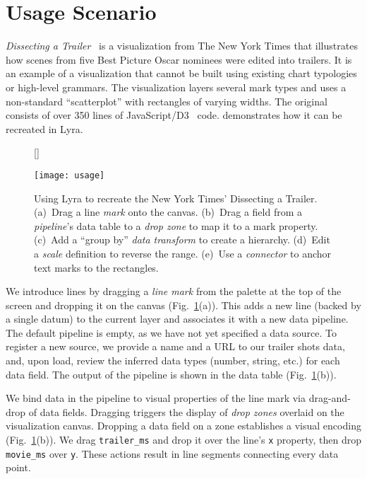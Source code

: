 \section{Usage Scenario}

\emph{Dissecting a Trailer}~\cite{nytimes:trailer} is a visualization from The
New York Times that illustrates how scenes from five Best Picture Oscar nominees
were edited into trailers. It is an example of a visualization that cannot be
built using existing chart typologies or high-level grammars. The visualization
layers several mark types and uses a non-standard ``scatterplot'' with
rectangles of varying widths. The original consists of over 350 lines of
JavaScript/D3~\cite{bostock:d3} code.  demonstrates how it
can be recreated in Lyra.

\begin{figure}[h!]
[\FBwidth]
{\caption{Using Lyra to recreate the New York Times' Dissecting a Trailer.
(a)~Drag a line \emph{mark} onto the canvas. (b)~Drag a field from a
\emph{pipeline}'s data table to a \emph{drop zone} to map it to a mark property.
(c)~Add a ``group by'' \emph{data transform} to create a hierarchy. (d)~Edit a
\emph{scale} definition to reverse the range. (e)~Use a \emph{connector} to
anchor text marks to the rectangles.}
\label{fig:lyra:usage}}
{\texttt{[image: usage]}}
\end{figure}

We introduce lines by dragging a \emph{line mark} from the palette at the top of
the screen and dropping it on the canvas (Fig.~\ref{fig:lyra:usage}(a)). This
adds a new line (backed by a single datum) to the current layer and associates
it with a new data pipeline. The default pipeline is empty, as we have not yet
specified a data source. To register a new source, we provide a name and a URL
to our trailer shots data, and, upon load, review the inferred data types
(number, string, etc.) for each data field. The output of the pipeline is
shown in the data table (Fig.~\ref{fig:lyra:usage}(b)).

We bind data in the pipeline to visual properties of the line mark via
drag-and-drop of data fields. Dragging triggers the display of \emph{drop zones}
overlaid on the visualization canvas. Dropping a data field on a zone
establishes a visual encoding (Fig.~\ref{fig:lyra:usage}(b)). We drag
\texttt{trailer\_ms} and drop it over the line's \texttt{x} property, then drop
\texttt{movie\_ms} over \texttt{y}. These actions result in line segments
connecting every data point.

